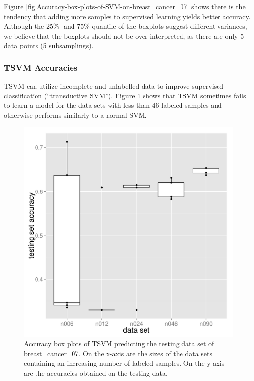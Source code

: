 Figure \ref{fig:Accuracy-box-plots-of-SVM-on-breast_cancer_07} shows
there is the tendency that adding more samples to supervised learning
yields better accuracy. Although the 25\%- and 75\%-quantile of the
boxplots suggest different variances, we believe that the boxplots
should not be over-interpreted, as there are only 5 data points (5
subsamplings).

\subsubsection{TSVM Accuracies}

TSVM can utilize incomplete and unlabelled data to improve supervised
classification (``transductive SVM''). Figure \ref{fig:Accuracy-box-plots-of-TSVM-on-breast_cancer_07}
shows that TSVM sometimes fails to learn a model for the data sets
with less than 46 labeled samples and otherwise performs similarly
to a normal SVM.

\begin{figure}
\begin{centering}
\includegraphics[width=0.34\paperwidth]{images/breast_cancer_07-accuracies-svmlight.pdf}
\par\end{centering}
\caption[Accuracy box plots of TSVM predicting data set of breast\_cancer\_07.]{\label{fig:Accuracy-box-plots-of-TSVM-on-breast_cancer_07}Accuracy
box plots of TSVM predicting the testing data set of breast\_cancer\_07.
On the x-axis are the sizes of the data sets containing an increasing
number of labeled samples. On the y-axis are the accuracies obtained
on the testing data.}
\end{figure}

